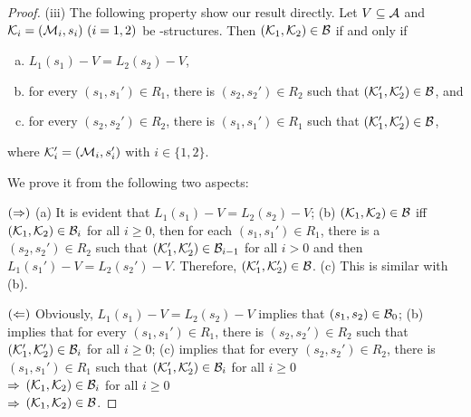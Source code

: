\documentclass{article}
\begin{document}
\begin{proof}
 (iii)
 The following property show our result directly.
 Let $V\subseteq\cal A$
 and ${\cal K}_i=({\cal M}_i,s_i)~(i=1,2)$ be \MPK-structures.
 Then $({\cal K}_1,{\cal K}_2)\in\cal B$ if and only if
   \begin{enumerate}[(a)]
     \item $L_1(s_1)- V = L_2(s_2)- V$,
     \item for every $(s_1,s_1')\in R_1$, there is $(s_2,s_2')\in R_2$
     such that $({\cal K}_1',{\cal K}_2')\in {\cal B}$, and
     \item for every $(s_2,s_2')\in R_2$, there is $(s_1,s_1')\in R_1$
     such that $({\cal K}_1',{\cal K}_2')\in {\cal B}$,
   \end{enumerate}
  where ${\cal K}_i'=({\cal M}_i,s_i')$ with $i\in\{1,2\}$.

  We prove it from the following two aspects:

  $(\Rightarrow)$
 (a) It is evident that $L_1(s_1)- V = L_2(s_2)- V$;
 (b) %
 $({\cal K}_1, {\cal K}_2) \in {\cal B}$ iff $({\cal K}_1, {\cal K}_2) \in {\cal B}_i$ for all $i \geq 0$, then for each $(s_1, s_1') \in R_1$, there is a $(s_2, s_2')\in R_2$  such that  $({\cal K}_1', {\cal K}_2') \in {\cal B}_{i-1}$ for all $i > 0$ and then $L_1(s_1')- V = L_2(s_2')- V$. Therefore, $({\cal K}_1', {\cal K}_2') \in {\cal B}$.
 (c) %
  This is similar with (b).

 $(\Leftarrow)$ Obviously, $L_1(s_1)- V = L_2(s_2)- V$ implies that $(s_1, s_2) \in {\cal B}_0$;
  (b) implies that for every $(s_1,s_1')\in R_1$, there is $(s_2,s_2')\in R_2$
     such that $({\cal K}_1',{\cal K}_2')\in {\cal B}_i$ for all $i \geq 0$;
 (c) implies that for every $(s_2,s_2')\in R_2$, there is $(s_1,s_1')\in R_1$
     such that $({\cal K}_1',{\cal K}_2')\in {\cal B}_i$ for all $i \geq 0$\\
 $\Rightarrow$ $({\cal K}_1, {\cal K}_2) \in {\cal B}_i$ for all $i \geq 0$\\
 $\Rightarrow$ $({\cal K}_1,{\cal K}_2)\in\cal B$.



\end{proof}
\end{document}
